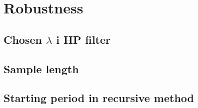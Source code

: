 \section{Robustness}

\subsection{Chosen $\lambda$ i HP filter}

\subsection{Sample length}

\subsection{Starting period in recursive method}